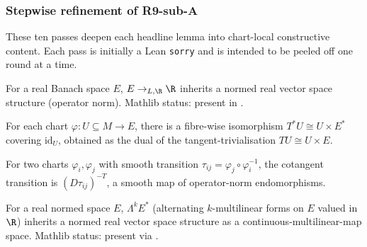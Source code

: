 \subsubsection*{Stepwise refinement of R9-sub-A}

These ten passes deepen each headline lemma into chart-local
constructive content.  Each pass is initially a Lean \texttt{sorry}
and is intended to be peeled off one round at a time.

\begin{lemma}
\label{lem:r9subA-cot-r1}
For a real Banach space \(E\), \(E\to_{L,\R}\R\) inherits a normed
real vector space structure (operator norm).  Mathlib status:
present in .
\leanok\mathlibok
\end{lemma}

\begin{lemma}
\label{lem:r9subA-cot-r2}
For each chart \(\varphi:U\subseteq M\to E\), there is a fibre-wise
isomorphism \(T^{*}U\cong U\times E^{*}\) covering \(\mathrm{id}_{U}\),
obtained as the dual of the tangent-trivialisation
\(TU\cong U\times E\).
\leanok
\end{lemma}

\begin{lemma}
\label{lem:r9subA-cot-r3}
For two charts \(\varphi_{i},\varphi_{j}\) with smooth transition
\(\tau_{ij}=\varphi_{j}\circ\varphi_{i}^{-1}\), the cotangent
transition is \((D\tau_{ij})^{-T}\), a smooth map of operator-norm
endomorphisms.
\leanok
\end{lemma}

\begin{lemma}
\label{lem:r9subA-exp-r1}
For a real normed space \(E\), \(\Lambda^{k}E^{*}\) (alternating
\(k\)-multilinear forms on \(E\) valued in \(\R\)) inherits a
normed real vector space structure as a continuous-multilinear-map
space.  Mathlib status: present via
.
\leanok\mathlibok
\end{lemma}

